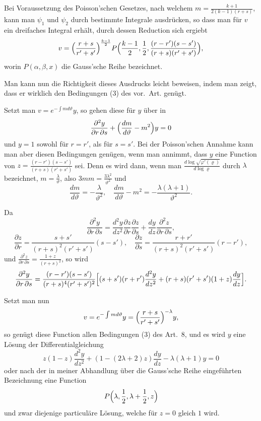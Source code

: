 \documentclass[12pt,a4paper]{book}
\theoremstyle{definition}
\theoremstyle{remark}
\begin{document}
Bei Voraussetzung des Poisson'schen Gesetzes, nach welchem $m = \frac{k+1}{2(k-1)(r+s)}$, kann man $\psi_{1}$ und $\psi_{2}$ durch bestimmte Integrale ausdr\"ucken, so dass man f\"ur $v$ ein dreifaches Integral erh\"alt, durch dessen Reduction sich ergiebt
\[
v = \Bigl(\frac{r+s}{r'+s'}\Bigr)^{\frac{k-1}{2}}P\Bigl(\frac{k-1}{2}, \frac{1}{2}, \frac{(r-r')(s-s')}{(r+s)(r'+s')}\Bigr),
\]
worin $P(\alpha, \beta, x)$ die Gauss'sche Reihe bezeichnet.

Man kann nun die Richtigkeit dieses Ausdrucks leicht beweisen, indem man zeigt, dass er wirklich den Bedingungen (3) des vor.~Art. gen\"ugt.

Setzt man $v = e^{-\int md\vartheta}y$, so gehen diese f\"ur $y$ \"uber in
\[
\frac{\partial^{2}y}{\partial r\,\partial s} + \Bigl(\frac{dm}{d\vartheta} - m^{2}\Bigr)y = 0
\]
und $y = 1$ sowohl f\"ur $r = r'$, als f\"ur $s = s'$. Bei der Poisson'schen Annahme kann man aber diesen Bedingungen gen\"ugen, wenn man annimmt, dass $y$ eine Function von $z = \frac{(r-r')(s-s')}{(r+s)(r'+s')}$ sei. Denn es wird dann, wenn man $\frac{d\log\sqrt{\varphi'(\varrho)}}{d\log\varrho}$ durch $\lambda$ bezeichnet, $m = \frac{\lambda}{\vartheta}$, also $3mm = \frac{3\lambda^{2}}{\vartheta^{2}}$ und
\[
\frac{dm}{d\vartheta} = -\frac{\lambda}{\vartheta^{2}},\quad\frac{dm}{d\vartheta} - m^{2} = -\frac{\lambda(\lambda+1)}{\vartheta^{2}}.
\]

Da
\[
\frac{\partial^{2}y}{\partial r\,\partial s} = \frac{d^{2}y}{dz^{2}}\frac{\partial z}{\partial r}\frac{\partial z}{\partial s} + \frac{dy}{dz}\frac{\partial^{2}z}{\partial r\,\partial s},
\]
\[
\frac{\partial z}{\partial r} = \frac{s+s'}{(r+s)^{2}(r'+s')}(s-s'),\quad \frac{\partial z}{\partial s} = \frac{r+r'}{(r+s)^{2}(r'+s')}(r-r'),
\]
und $\frac{\partial^{2}z}{\partial r\,\partial s} = \frac{1+z}{(r+s)^{2}}$, so wird
\[
\frac{\partial^{2}y}{\partial r\,\partial s} = \frac{(r-r')(s-s')}{(r+s)^{4}(r'+s')^{2}}\Bigl[(s+s')(r+r')\frac{d^{2}y}{dz^{2}} + (r+s)(r'+s')(1+z)\frac{dy}{dz}\Bigr].
\]

Setzt man nun
\[
v = e^{-\int md\vartheta}y = \Bigl(\frac{r+s}{r'+s'}\Bigr)^{-\lambda}y,
\]
so gen\"ugt diese Function allen Bedingungen (3) des Art.~8, und es wird $y$ eine L\"osung der Differentialgleichung
\[
z(1-z)\frac{d^{2}y}{dz^{2}} + (1 - (2\lambda+2)z)\frac{dy}{dz} - \lambda(\lambda+1)y = 0
\]
oder nach der in meiner Abhandlung \"uber die Gauss'sche Reihe eingef\"uhrten Bezeichnung eine Function
\[
P\Bigl(\lambda, \frac{1}{2}, \lambda + \frac{1}{2}, z\Bigr)
\]
und zwar diejenige particul\"are L\"osung, welche f\"ur $z = 0$ gleich $1$ wird.
\end{document}
